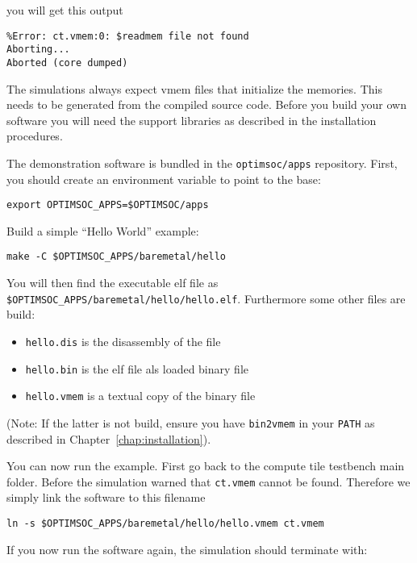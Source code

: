 you will get this output

\begin{lstlisting}
%Error: ct.vmem:0: $readmem file not found
Aborting...
Aborted (core dumped)
\end{lstlisting}

The simulations always expect vmem files that initialize the memories.
This needs to be generated from the compiled source code. Before you
build your own software you will need the support libraries as
described in the installation procedures.

The demonstration software is bundled in the \verb|optimsoc/apps|
repository. First, you should create an environment variable to point
to the base:

\begin{lstlisting}
export OPTIMSOC_APPS=$OPTIMSOC/apps
\end{lstlisting}

Build a simple ``Hello World'' example:

\begin{lstlisting}
make -C $OPTIMSOC_APPS/baremetal/hello
\end{lstlisting}

You will then find the executable elf file as
\verb|$OPTIMSOC_APPS/baremetal/hello/hello.elf|.
Furthermore some other files are build:

\begin{itemize}
\item \verb|hello.dis| is the disassembly of the file
\item \verb|hello.bin| is the elf file als loaded binary file
\item \verb|hello.vmem| is a textual copy of the binary file
\end{itemize}

(Note: If the latter is not build, ensure you have \verb|bin2vmem| in
your \verb|PATH| as described in Chapter~\ref{chap:installation}).

You can now run the example. First go back to the compute tile
testbench main folder. Before the simulation warned that
\verb|ct.vmem| cannot be found. Therefore we simply link the software
to this filename

\begin{lstlisting}
ln -s $OPTIMSOC_APPS/baremetal/hello/hello.vmem ct.vmem
\end{lstlisting}

If you now run the software again, the simulation should
terminate with:

